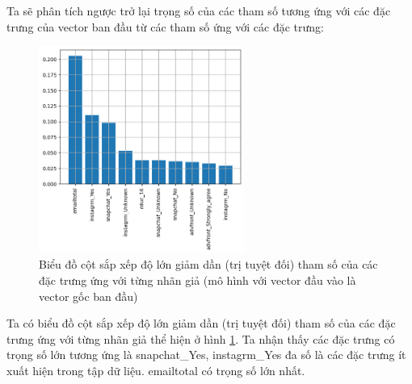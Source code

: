 \begin{enumerate}[label=(\alph*)]
    Ta sẽ phân tích ngược trở lại trọng số của các tham số tương ứng với các đặc trưng của vector ban đầu từ các tham số ứng với các đặc trưng:

    \begin{figure}[H]
        \centering
        \includegraphics[width=0.6\textwidth]{figures/Thanh/Models/Random_Forest/Non_null_models_Feature_Importance_Random_Forest_original_features.png}
        \caption{Biểu đồ cột sắp xếp độ lớn giảm dần (trị tuyệt đối) tham số của các đặc trưng ứng với từng nhãn giả (mô hình với vector đầu vào là vector gốc ban đầu)}
        \label{fig:Non_null_models_Feature_Importance_Random_Forest_original_features}
    \end{figure}

    Ta có biểu đồ cột sắp xếp độ lớn giảm dần (trị tuyệt đối) tham số của các đặc trưng ứng với từng nhãn giả thể hiện ở hình \ref{fig:Non_null_models_Feature_Importance_Random_Forest_original_features}.
    Ta nhận thấy các đặc trưng có trọng số lớn tương ứng là snapchat\_Yes, instagrm\_Yes đa số là các đặc trưng ít xuất hiện trong tập dữ liệu.
    emailtotal có trọng số lớn nhất.
\end{enumerate}